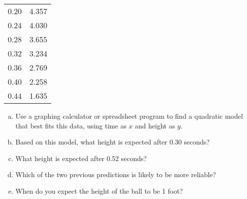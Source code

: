 \begin{exercises}
{\begin{center}
\begin{tabular}{c c}
0.20 & 4.357\\
0.24 & 4.030\\
0.28 & 3.655\\
0.32 & 3.234\\
0.36 & 2.769\\
0.40 & 2.258\\
0.44 & 1.635
\end{tabular}
\end{center}
\begin{enumerate}[(a)]
\item Use a graphing calculator or spreadsheet program to find a quadratic model that best fits this data, using time as $x$ and height as $y$.
\item Based on this model, what height is expected after 0.30 seconds?
\item What height is expected after 0.52 seconds?
\item Which of the two previous predictions is likely to be more reliable?
\item When do you expect the height of the ball to be 1 foot?
\end{enumerate}}


\end{exercises}
